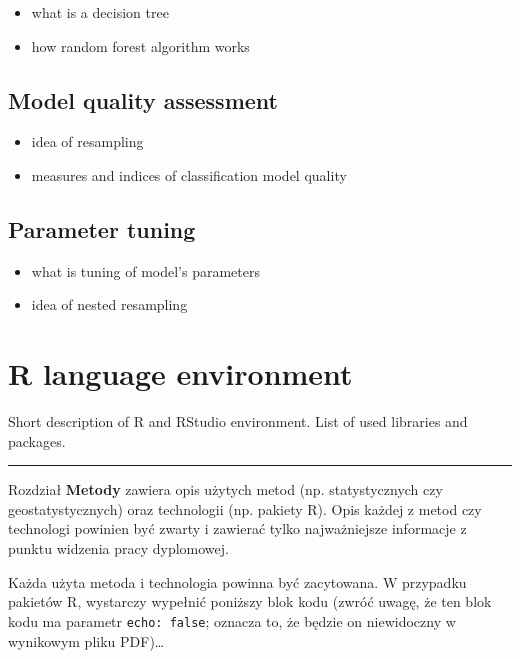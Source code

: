 \documentclass{amuthesis}
\begin{document}
\begin{itemize}
\item
  what is a decision tree
\item
  how random forest algorithm works
\end{itemize}

\hypertarget{sec-resampling}{%
\subsection{Model quality assessment}\label{sec-resampling}}

\begin{itemize}
\item
  idea of resampling
\item
  measures and indices of classification model quality
\end{itemize}

\hypertarget{sec-tuning}{%
\subsection{Parameter tuning}\label{sec-tuning}}

\begin{itemize}
\item
  what is tuning of model's parameters
\item
  idea of nested resampling
\end{itemize}

\hypertarget{sec-r}{%
\section{R language environment}\label{sec-r}}

Short description of R and RStudio environment. List of used libraries
and packages.

\begin{center}\rule{0.5\linewidth}{0.5pt}\end{center}

Rozdział \textbf{Metody} zawiera opis użytych metod (np. statystycznych
czy geostatystycznych) oraz technologii (np. pakiety R). Opis każdej z
metod czy technologi powinien być zwarty i zawierać tylko najważniejsze
informacje z punktu widzenia pracy dyplomowej.

Każda użyta metoda i technologia powinna być zacytowana. W przypadku
pakietów R, wystarczy wypełnić poniższy blok kodu (zwróć uwagę, że ten
blok kodu ma parametr \texttt{echo:\ false}; oznacza to, że będzie on
niewidoczny w wynikowym pliku PDF)\ldots{}
\end{document}
